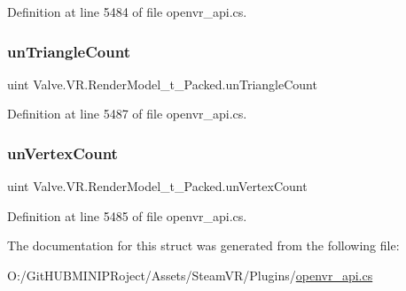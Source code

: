 Definition at line 5484 of file openvr\+\_\+api.\+cs.

\mbox{\label{struct_valve_1_1_v_r_1_1_render_model__t___packed_a9729cbcd5c61320e7ad802b72d552c3d}} 
\subsubsection{\texorpdfstring{unTriangleCount}{unTriangleCount}}
{\footnotesize\ttfamily uint Valve.\+V\+R.\+Render\+Model\+\_\+t\+\_\+\+Packed.\+un\+Triangle\+Count}



Definition at line 5487 of file openvr\+\_\+api.\+cs.

\mbox{\label{struct_valve_1_1_v_r_1_1_render_model__t___packed_a28ee2915f267296786ff490d73696d2c}} 
\subsubsection{\texorpdfstring{unVertexCount}{unVertexCount}}
{\footnotesize\ttfamily uint Valve.\+V\+R.\+Render\+Model\+\_\+t\+\_\+\+Packed.\+un\+Vertex\+Count}



Definition at line 5485 of file openvr\+\_\+api.\+cs.



The documentation for this struct was generated from the following file\+:\begin{DoxyCompactItemize}
\item 
O\+:/\+Git\+H\+U\+B\+M\+I\+N\+I\+P\+Roject/\+Assets/\+Steam\+V\+R/\+Plugins/\mbox{\hyperlink{openvr__api_8cs}{openvr\+\_\+api.\+cs}}\end{DoxyCompactItemize}
